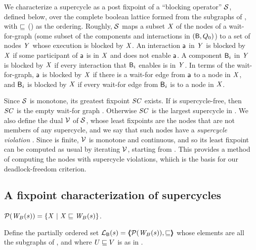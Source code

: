 We characterize a supercycle as a post fixpoint of a ``blocking operator'' $\mathcal{S}$, defined below, over the complete boolean lattice formed from the
subgraphs of , with $\sqsubseteq$ () as the ordering.
%
Roughly, $\mathcal{S}$ maps a subset $\mathit{X}$ of the nodes of a wait-for-graph (\ie some subset of the components and interactions in $(\mathsf{B}, Q_0)$)
to a set of nodes $\mathit{Y}$ whose execution is blocked by $\mathit{X}$. An interaction $\mathsf{a}$ in $\mathit{Y}$ is blocked by $\mathit{X}$ if some participant of $\mathsf{a}$ is in $\mathit{X}$ and does
not enable $\mathsf{a}$. A component $\mathsf{B}_i$  in $\mathit{Y}$ is blocked by $\mathit{X}$ if every interaction that $\mathsf{B}_i$ enables is in $\mathit{Y}$. In terms of the wait-for-graph, 
$\mathsf{a}$ is blocked by $\mathit{X}$ if there is a wait-for edge from $\mathsf{a}$ to a node in $\mathit{X}$, and $\mathsf{B}_i$ is blocked by $\mathit{X}$ if every wait-for edge from $\mathsf{B}_i$ is to a
node in $\mathit{X}$. 

Since $\mathcal{S}$ is monotone, its greatest fixpoint $\mathit{SC}$ exists.  If  is supercycle-free, then $\mathit{SC}$ is the empty wait-for graph \ewfg.
Otherwise $\mathit{SC}$ is the largest supercycle in .  We also define the dual $\mathcal{V}$ of $\mathcal{S}$, whose least fixpoints are the nodes that are not
members of any supercycle, and we say that such nodes have a \emph{supercycle violation} . Since  is finite, 
$\mathcal{V}$ is monotone and continuous, and so its least fixpoint can be computed as usual by iterating $\mathcal{V}$, starting from \ewfg.
This provides a method of computing the nodes with supercycle violations, whiich is the basis for our deadlock-freedom criterion.



\subsection{A fixpoint characterization of supercycles}
\label{secn:supercycle-fixpoint}

\begin{definition} \label{defn:wsetOfSubgraphs}
$\mathcal{P}(\mathit{W}_{B}({s})) = \{  \mathit{X} ~|~ \mathit{X} \sqsubseteq \mathit{W}_{B}({s})  \}$.
\end{definition}


\begin{definition} \label{defn:wflattice}
Define the partially ordered set $\mathcal{L}_{\mathsf{B}}({s}) = \langle \hspace{-0.34em} \langle \hspace{-0.34em} \langle  \mathcal{P}(\mathit{W}_{B}({s})), \sqsubseteq  \rangle \hspace{-0.34em} \rangle \hspace{-0.34em} \rangle$ %
whose elements are all the subgraphs of 
, and where  $U \sqsubseteq V$ is as in .   
\end{definition}

